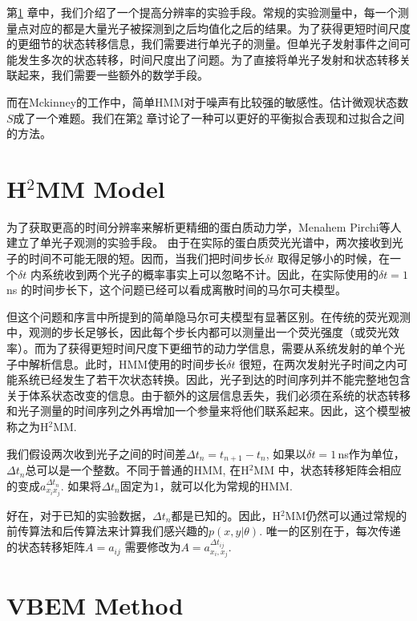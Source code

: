 \documentclass[11pt, a4paper]{article}
\begin{document}
第\ref{chapter:H2MM} 章中，我们介绍了一个提高分辨率的实验手段。常规的实验测量中，每一个测量点对应的都是大量光子被探测到之后均值化之后的结果。为了获得更短时间尺度的更细节的状态转移信息，我们需要进行单光子的测量。但单光子发射事件之间可能发生多次的状态转移，时间尺度出了问题。为了直接将单光子发射和状态转移关联起来，我们需要一些额外的数学手段。

而在Mckinney的工作中，简单HMM对于噪声有比较强的敏感性。估计微观状态数$S$成了一个难题。我们在第\ref{chapter:VBEM} 章讨论了一种可以更好的平衡拟合表现和过拟合之间的方法。


\section{H$^2$MM Model}\label{chapter:H2MM}

    为了获取更高的时间分辨率来解析更精细的蛋白质动力学，Menahem Pirchi等人建立了单光子观测的实验手段\cite{H2MM}。 由于在实际的蛋白质荧光光谱中，两次接收到光子的时间不可能无限的短。因而，当我们把时间步长$\delta t$ 取得足够小的时候，在一个$\delta t$ 内系统收到两个光子的概率事实上可以忽略不计。因此，在实际使用的$\delta t = 1\,$ns 的时间步长下，这个问题已经可以看成离散时间的马尔可夫模型。

    但这个问题和序言中所提到的简单隐马尔可夫模型有显著区别。在传统的荧光观测中，观测的步长足够长，因此每个步长内都可以测量出一个荧光强度（或荧光效率）。而为了获得更短时间尺度下更细节的动力学信息，需要从系统发射的单个光子中解析信息。此时，HMM使用的时间步长$\delta t$ 很短，在两次发射光子时间之内可能系统已经发生了若干次状态转换。因此，光子到达的时间序列并不能完整地包含关于体系状态改变的信息。由于额外的这层信息丢失，我们必须在系统的状态转移和光子测量的时间序列之外再增加一个参量来将他们联系起来。因此，这个模型被称之为H$^2$MM.

    我们假设两次收到光子之间的时间差$\Delta t_n = t_{n+1}-t_n$, 如果以$\delta t=1\,$ns作为单位，$\Delta t_n$总可以是一个整数。不同于普通的HMM, 在H$^2$MM 中，状态转移矩阵会相应的变成$a_{x_ix_j}^{\Delta t_n}$. 如果将$\Delta t_n$固定为1，就可以化为常规的HMM.

    好在，对于已知的实验数据，$\Delta t_n$都是已知的。因此，H$^2$MM仍然可以通过常规的前传算法和后传算法来计算我们感兴趣的$p(x,y|\theta)$. 唯一的区别在于，每次传递的状态转移矩阵$A=a_{ij}$ 需要修改为$A=a^{\Delta t_{ij}}_{x_i, x_j}$.







\section{VBEM Method}\label{chapter:VBEM}
\end{document}
